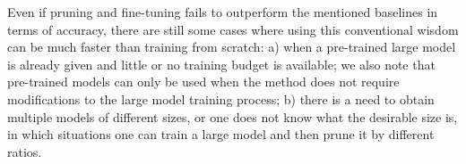  Even if pruning and fine-tuning fails to outperform the mentioned baselines in terms of accuracy, there are still some cases where using this conventional wisdom can be much faster than training from scratch:
a) when a pre-trained large model is already given and little or no training budget is available; we also note that pre-trained models can only be used when the method does not require modifications to the large model training process;
b) there is a need to obtain multiple models of different sizes, or one does not know what the desirable size is, in which situations one can train a large model and then prune it by different ratios.




